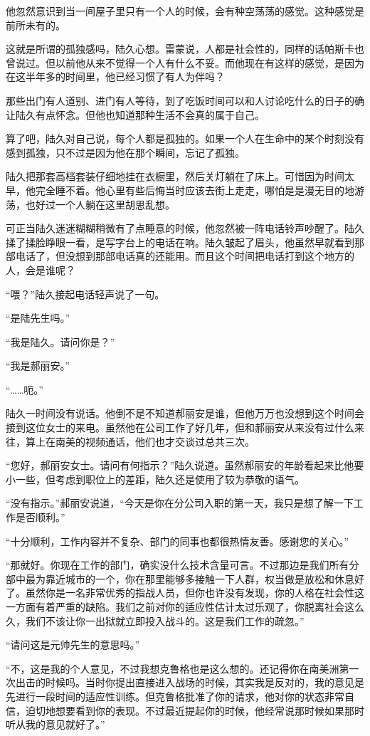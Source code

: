 他忽然意识到当一间屋子里只有一个人的时候，会有种空荡荡的感觉。这种感觉是前所未有的。

这就是所谓的孤独感吗，陆久心想。雷蒙说，人都是社会性的，同样的话帕斯卡也曾说过。但以前他从来不觉得一个人有什么不妥。而他现在有这样的感觉，是因为在这半年多的时间里，他已经习惯了有人为伴吗？

那些出门有人道别、进门有人等待，到了吃饭时间可以和人讨论吃什么的日子的确让陆久有点怀念。但他也知道那种生活不会真的属于自己。

算了吧，陆久对自己说，每个人都是孤独的。如果一个人在生命中的某个时刻没有感到孤独，只不过是因为他在那个瞬间，忘记了孤独。

陆久把那套高档套装仔细地挂在衣橱里，然后关灯躺在了床上。可惜因为时间太早，他完全睡不着。他心里有些后悔当时应该去街上走走，哪怕是是漫无目的地游荡，也好过一个人躺在这里胡思乱想。

可正当陆久迷迷糊糊稍微有了点睡意的时候，他忽然被一阵电话铃声吵醒了。陆久揉了揉脸睁眼一看，是写字台上的电话在响。陆久皱起了眉头，他虽然早就看到那部电话了，但没想到那部电话真的还能用。而且这个时间把电话打到这个地方的人，会是谁呢？

“喂？”陆久接起电话轻声说了一句。

“是陆先生吗。”

“我是陆久。请问你是？”

“我是郝丽安。”

“……呃。”

陆久一时间没有说话。他倒不是不知道郝丽安是谁，但他万万也没想到这个时间会接到这位女士的来电。虽然他在公司工作了好几年，但和郝丽安从来没有过什么来往，算上在南美的视频通话，他们也才交谈过总共三次。

“您好，郝丽安女士。请问有何指示？”陆久说道。虽然郝丽安的年龄看起来比他要小一些，但考虑到职位上的差距，陆久还是使用了较为恭敬的语气。

“没有指示。”郝丽安说道，“今天是你在分公司入职的第一天，我只是想了解一下工作是否顺利。”

“十分顺利，工作内容并不复杂、部门的同事也都很热情友善。感谢您的关心。”

“那就好。你现在工作的部门，确实没什么技术含量可言。不过那边是我们所有分部中最为靠近城市的一个，你在那里能够多接触一下人群，权当做是放松和休息好了。虽然你是一名非常优秀的指战人员，但你也许没有发现，你的人格在社会性这一方面有着严重的缺陷。我们之前对你的适应性估计太过乐观了，你脱离社会这么久，我们不该让你一出狱就立即投入战斗的。这是我们工作的疏忽。”

“请问这是元帅先生的意思吗。”

“不，这是我的个人意见，不过我想克鲁格也是这么想的。还记得你在南美洲第一次出击的时候吗。当时你提出直接进入战场的时候，其实我是反对的，我的意见是先进行一段时间的适应性训练。但克鲁格批准了你的请求，他对你的状态非常自信，迫切地想要看到你的表现。不过最近提起你的时候，他经常说那时候如果那时听从我的意见就好了。”

